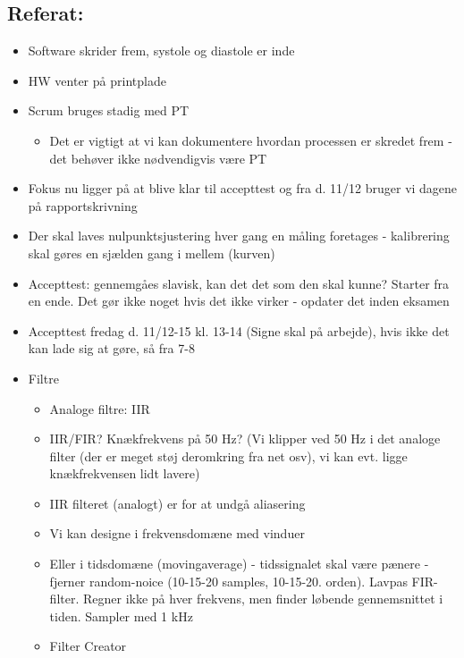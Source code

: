 \documentclass[a4paper,11pt,oneside]{memoir}
\begin{document}
\subsection{Referat:}
\begin{itemize}
\item Software skrider frem, systole og diastole er inde
\item HW venter på printplade
\item Scrum bruges stadig med PT
\begin{itemize}
\item Det er vigtigt at vi kan dokumentere hvordan processen er skredet frem - det behøver ikke nødvendigvis være PT
\end{itemize}
\item Fokus nu ligger på at blive klar til accepttest og fra d. 11/12 bruger vi dagene på rapportskrivning
\item Der skal laves nulpunktsjustering hver gang en måling foretages - kalibrering skal gøres en sjælden gang i mellem (kurven)
\item Accepttest: gennemgåes slavisk, kan det det som den skal kunne? Starter fra en ende. Det gør ikke noget hvis det ikke virker - opdater det inden eksamen
\item Accepttest fredag d. 11/12-15 kl. 13-14 (Signe skal på arbejde), hvis ikke det kan lade sig at gøre, så fra 7-8
\item Filtre
\begin{itemize}
\item Analoge filtre: IIR 
\item IIR/FIR? Knækfrekvens på 50 Hz? (Vi klipper ved 50 Hz i det analoge filter (der er meget støj deromkring fra net osv), vi kan evt. ligge knækfrekvensen lidt lavere)
\item IIR filteret (analogt) er for at undgå aliasering 
\item Vi kan designe i frekvensdomæne med vinduer
\item Eller i tidsdomæne (movingaverage) - tidssignalet skal være pænere - fjerner random-noice (10-15-20 samples, 10-15-20. orden). Lavpas FIR-filter. Regner ikke på hver frekvens, men finder løbende gennemsnittet i tiden. Sampler med 1 kHz
\item Filter Creator 
\end{itemize}
\end{itemize}
\end{document}
